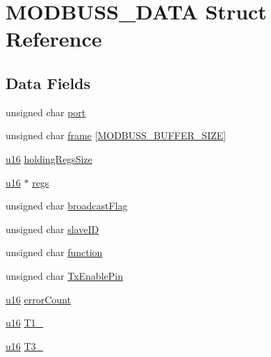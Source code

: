 \hypertarget{struct_m_o_d_b_u_s_s___d_a_t_a}{\section{M\-O\-D\-B\-U\-S\-S\-\_\-\-D\-A\-T\-A Struct Reference}
\label{struct_m_o_d_b_u_s_s___d_a_t_a}
}
\subsection*{Data Fields}
\begin{DoxyCompactItemize}
\item 
unsigned char \hyperlink{struct_m_o_d_b_u_s_s___d_a_t_a_ac89e2c19de60b8f23bdd3789b2af094d}{port}
\item 
unsigned char \hyperlink{struct_m_o_d_b_u_s_s___d_a_t_a_adde99c1f81da19926ec37aefb352105f}{frame} \mbox{[}\hyperlink{_simple_modbus_slave_8c_a221290ca5462952fc70496b8ff7e745f}{M\-O\-D\-B\-U\-S\-S\-\_\-\-B\-U\-F\-F\-E\-R\-\_\-\-S\-I\-Z\-E}\mbox{]}
\item 
\hyperlink{p8_2pinguino_2core_2typedef_8h_a50b0d1c7a54fa09a64a3ac111c778520}{u16} \hyperlink{struct_m_o_d_b_u_s_s___d_a_t_a_afbecce71fe40843114ff8c05dc8236a3}{holding\-Regs\-Size}
\item 
\hyperlink{p8_2pinguino_2core_2typedef_8h_a50b0d1c7a54fa09a64a3ac111c778520}{u16} $\ast$ \hyperlink{struct_m_o_d_b_u_s_s___d_a_t_a_a0c404e2fd21adae90a9b7df0526e835e}{regs}
\item 
unsigned char \hyperlink{struct_m_o_d_b_u_s_s___d_a_t_a_a81875e8eaabbfa2c8076e6115ef1202b}{broadcast\-Flag}
\item 
unsigned char \hyperlink{struct_m_o_d_b_u_s_s___d_a_t_a_a4449d3474c101465e5039718e8130fce}{slave\-I\-D}
\item 
unsigned char \hyperlink{struct_m_o_d_b_u_s_s___d_a_t_a_aa975eee0843aaf71c1023b79871849b9}{function}
\item 
unsigned char \hyperlink{struct_m_o_d_b_u_s_s___d_a_t_a_ad048cd33a540516a2e4ec649694e2f1a}{Tx\-Enable\-Pin}
\item 
\hyperlink{p8_2pinguino_2core_2typedef_8h_a50b0d1c7a54fa09a64a3ac111c778520}{u16} \hyperlink{struct_m_o_d_b_u_s_s___d_a_t_a_a948d8d10cfc452655af4092061d7ac97}{error\-Count}
\item 
\hyperlink{p8_2pinguino_2core_2typedef_8h_a50b0d1c7a54fa09a64a3ac111c778520}{u16} \hyperlink{struct_m_o_d_b_u_s_s___d_a_t_a_a958e218469d86d7b186a26e7c03ddcd9}{T1\-\_}
\item 
\hyperlink{p8_2pinguino_2core_2typedef_8h_a50b0d1c7a54fa09a64a3ac111c778520}{u16} \hyperlink{struct_m_o_d_b_u_s_s___d_a_t_a_a447e609a8854bfac7df24c9fef39dfc7}{T3\-\_}
\end{DoxyCompactItemize}


